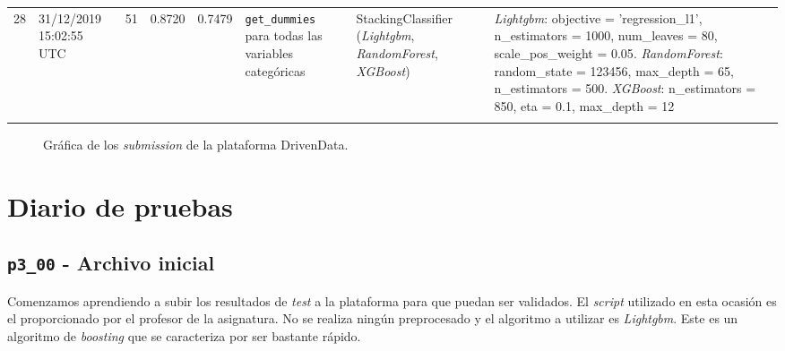 \documentclass[a4paper, 20pt]{article}
\begin{document}
\begin{longtable}{lL{2.1cm}lllL{3cm}L{2.4cm}L{3.5cm}}
28 & 31/12/2019 15:02:55 UTC & 51 & 0.8720 & 0.7479 & \texttt{get\_dummies} para todas las variables categóricas & StackingClassifier (\textit{Lightgbm}, \textit{RandomForest}, \textit{XGBoost}) & \textit{Lightgbm}: {\ttfamily objective = 'regression\_l1', n\_estimators = 1000, num\_leaves = 80, scale\_pos\_weight = 0.05}. \textit{RandomForest}: {\ttfamily random\_state = 123456, max\_depth = 65, n\_estimators = 500}. \textit{XGBoost}: {\ttfamily n\_estimators = 850, eta = 0.1, max\_depth = 12}\\
\bottomrule
\end{longtable}

\begin{figure}[H]
    \caption{Gráfica de los \textit{submission} de la plataforma DrivenData.}
\end{figure}

\newpage

\section{Diario de pruebas}
\subsection{\texttt{p3\_00} - Archivo inicial}
Comenzamos aprendiendo a subir los resultados de \textit{test} a la plataforma para que puedan ser validados. El \textit{script} utilizado en esta ocasión es el proporcionado por el profesor de la asignatura. No se realiza ningún preprocesado y el algoritmo a utilizar es \textit{Lightgbm}. Este es un algoritmo de \textit{boosting} que se caracteriza por ser bastante rápido.
\end{document}

